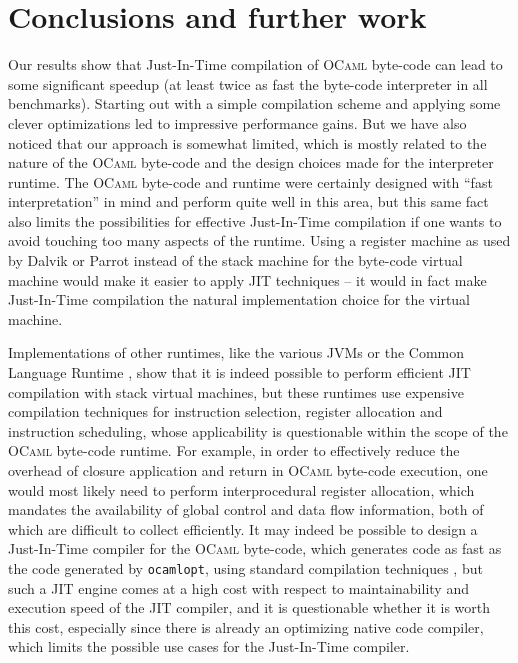\documentclass[12pt,a4paper,final]{article}
\begin{document}
\section{Conclusions and further work} \label{section:Conclusions_and_further_work}

Our results show that Just-In-Time compilation of \textsc{OCaml} byte-code can lead
to some significant speedup (at least twice as fast the byte-code interpreter in all
benchmarks). Starting out with a simple compilation scheme and applying some clever
optimizations led to impressive performance gains. But we have also noticed that our
approach is somewhat limited, which is mostly related to the nature of the \textsc{OCaml}
byte-code and the design choices made for the interpreter runtime.
The \textsc{OCaml} byte-code and runtime were certainly designed with ``fast interpretation''
in mind \cite{Leroy90} and perform quite well in this area, but this same fact also limits the
possibilities for effective Just-In-Time compilation if one wants to avoid touching too
many aspects of the runtime. Using a register machine as used by Dalvik \cite{Bornstein08}
or Parrot \cite{Coleda10} instead of the stack machine for the byte-code virtual machine would
make it easier to apply JIT techniques -- it would in fact make Just-In-Time compilation
the natural implementation choice for the virtual machine.

Implementations of other runtimes, like the various JVMs \cite{LindholmYellin99} or the
Common Language Runtime \cite{Ecma335},
show that it is indeed possible to perform efficient JIT compilation with stack virtual machines, but
these runtimes use expensive compilation techniques for instruction selection, register
allocation and instruction scheduling, whose applicability is questionable
within the scope of the \textsc{OCaml} byte-code runtime. For example, in order to
effectively reduce the overhead of closure application and return in \textsc{OCaml}
byte-code execution, one would most likely need to perform interprocedural register allocation,
which mandates the availability of global control and data flow information, both of which are
difficult to collect efficiently.
It may indeed be possible to design a Just-In-Time compiler for the \textsc{OCaml}
byte-code, which generates code as fast as the code generated by \texttt{ocamlopt},
using standard compilation techniques \cite{Aho06}, but such a JIT engine comes at
a high cost with respect to maintainability and execution speed of the JIT compiler, and it
is questionable whether it is worth this cost, especially since there is already an optimizing native code
compiler, which limits the possible use cases for the Just-In-Time compiler.
\end{document}
